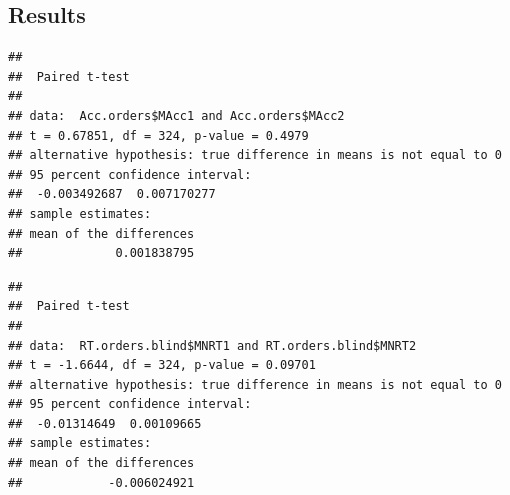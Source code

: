 \documentclass[
  english,
  man]{apa7}
\begin{document}
\hypertarget{results-1}{%
\subsection{Results}\label{results-1}}

\begin{verbatim}
## 
##  Paired t-test
## 
## data:  Acc.orders$MAcc1 and Acc.orders$MAcc2
## t = 0.67851, df = 324, p-value = 0.4979
## alternative hypothesis: true difference in means is not equal to 0
## 95 percent confidence interval:
##  -0.003492687  0.007170277
## sample estimates:
## mean of the differences 
##             0.001838795
\end{verbatim}

\begin{verbatim}
## 
##  Paired t-test
## 
## data:  RT.orders.blind$MNRT1 and RT.orders.blind$MNRT2
## t = -1.6644, df = 324, p-value = 0.09701
## alternative hypothesis: true difference in means is not equal to 0
## 95 percent confidence interval:
##  -0.01314649  0.00109665
## sample estimates:
## mean of the differences 
##            -0.006024921
\end{verbatim}
\end{document}
